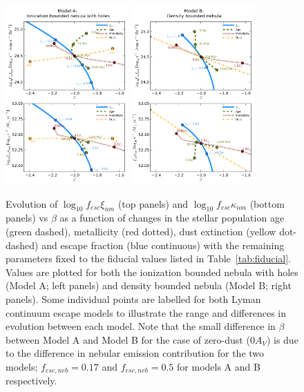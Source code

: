 \begin{figure}
  \includegraphics[width=0.42\textwidth]{plots/Fig7a.pdf}\quad
  \includegraphics[width=0.42\textwidth]{plots/Fig7b.pdf}
  \caption{Evolution of $\log_{10}f_{esc}\xi_{ion}$ (top panels) and $\log_{10}f_{esc}\kappa_{ion}$ (bottom panels) vs $\beta$ as a function of changes in the stellar population age (green dashed), metallicity (red dotted), dust extinction (yellow dot-dashed) and escape fraction (blue continuous) with the remaining parameters fixed to the fiducial values listed in Table~\ref{tab:fiducial}. Values are plotted for both the ionization bounded nebula with holes (Model A; left panels) and density bounded nebula (Model B; right panels). Some individual points are labelled for both Lyman continuum escape models to illustrate the range and differences in evolution between each model. Note that the small difference in $\beta$ between Model A and Model B for the case of zero-dust ($0 A_{V}$) is due to the difference in nebular emission contribution for the two models; $f_{esc,neb} = 0.17$ and $f_{esc,neb} = 0.5$ for models A and B respectively.}
  \label{fig:xi_evol}
\end{figure}

